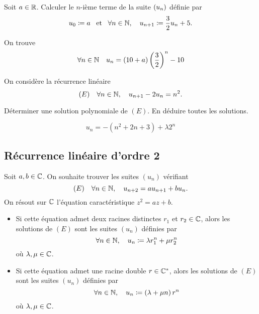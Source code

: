 \documentclass{magnolia}
\begin{document}

\begin{exos}
\exo Soit $a\in\mathbb{R}$. Calculer le $n$-ième terme de la suite $\left(u_n\right)$
  définie par
  \[u_0\coloneqq a \quad\!\text{et}\quad\! \forall n\in\mathbb{N} ,\quad u_{n+1}\coloneqq\frac{3}{2}u_n+5.\]
  \begin{sol}
  On trouve
  \[\forall n\in\mathbb{N} \quad u_n=\left(10+a\right)\left(\frac{3}{2}\right)^n-10\]
  \end{sol}
\exo On considère la récurrence linéaire
  \[(E) \quad \forall n\in\mathbb{N},\quad u_{n+1}-2u_n=n^2.\]
  \begin{questions}
  \question Déterminer une solution polynomiale de $(E)$.
  \question En déduire toutes les solutions.
  \end{questions}
  \begin{sol}
\[u_n=-(n^2+2n+3)+\lambda 2^n\]
  \end{sol}
\end{exos}

\subsection{Récurrence linéaire d'ordre 2}
\begin{proposition}[utile=-3]
Soit $a,b\in\mathbb{C}$. On souhaite trouver les suites $(u_n)$ vérifiant
\[(E)\quad\forall n\in\mathbb{N} ,\quad u_{n+2}=au_{n+1}+b u_n.\]
On résout sur $\mathbb{C}$ l'équation caractéristique $z^2=az+b$.
\begin{itemize}
\item Si cette équation admet deux racines distinctes $r_1$ et $r_2\in\mathbb{C}$, alors
  les solutions de $(E)$ sont les suites $(u_n)$ définies par
  \[\forall n\in\mathbb{N} ,\quad u_n\coloneqq\lambda r_1^n +\mu r_2^n\]
  où $\lambda,\mu\in\mathbb{C}$.
\item Si cette équation admet une racine double $r\in\mathbb{C}^*$, alors 
  les solutions de $(E)$ sont les suites $(u_n)$ définies par
  \[\forall n\in\mathbb{N} ,\quad u_n\coloneqq\left(\lambda +\mu n\right)r^n\]
  où $\lambda,\mu\in\mathbb{C}$.
\end{itemize}
\end{proposition}
\end{document}
